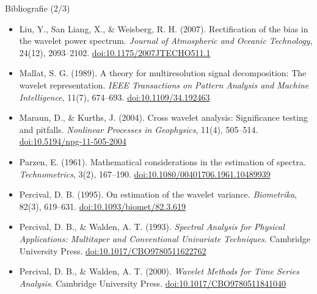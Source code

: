 \begin{frame}{Bibliografie (2/3)}
\begin{itemize}
    \item Liu, Y., San Liang, X., \& Weisberg, R. H. (2007). Rectification of the bias in the wavelet power spectrum. \textit{Journal of Atmospheric and Oceanic Technology}, 24(12), 2093--2102. \href{https://doi.org/10.1175/2007JTECHO511.1}{doi:10.1175/2007JTECHO511.1}
    \item Mallat, S. G. (1989). A theory for multiresolution signal decomposition: The wavelet representation. \textit{IEEE Transactions on Pattern Analysis and Machine Intelligence}, 11(7), 674--693. \href{https://doi.org/10.1109/34.192463}{doi:10.1109/34.192463}
    \item Maraun, D., \& Kurths, J. (2004). Cross wavelet analysis: Significance testing and pitfalls. \textit{Nonlinear Processes in Geophysics}, 11(4), 505--514. \href{https://doi.org/10.5194/npg-11-505-2004}{doi:10.5194/npg-11-505-2004}
    \item Parzen, E. (1961). Mathematical considerations in the estimation of spectra. \textit{Technometrics}, 3(2), 167--190. \href{https://doi.org/10.1080/00401706.1961.10489939}{doi:10.1080/00401706.1961.10489939}
    \item Percival, D. B. (1995). On estimation of the wavelet variance. \textit{Biometrika}, 82(3), 619--631. \href{https://doi.org/10.1093/biomet/82.3.619}{doi:10.1093/biomet/82.3.619}
    \item Percival, D. B., \& Walden, A. T. (1993). \textit{Spectral Analysis for Physical Applications: Multitaper and Conventional Univariate Techniques}. Cambridge University Press. \href{https://doi.org/10.1017/CBO9780511622762}{doi:10.1017/CBO9780511622762}
    \item Percival, D. B., \& Walden, A. T. (2000). \textit{Wavelet Methods for Time Series Analysis}. Cambridge University Press. \href{https://doi.org/10.1017/CBO9780511841040}{doi:10.1017/CBO9780511841040}
\end{itemize}
\end{frame}

